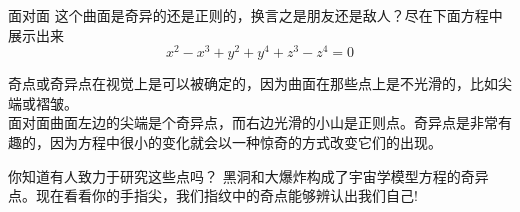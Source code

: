 ﻿\begin{surferPage}{面对面}
这个曲面是奇异的还是正则的，换言之是朋友还是敌人？尽在下面方程中展示出来\\
\smallskip
\[x^2	- x^3+ y^2+ y^4+ z^3- z^4	=  0\]

\vspace{0.3cm}

奇点或奇异点在视觉上是可以被确定的，因为曲面在那些点上是不光滑的，比如尖端或褶皱。\\

\vspace{0.3cm}
面对面曲面左边的尖端是个奇异点，而右边光滑的小山是正则点。奇异点是非常有趣的，因为方程中很小的变化就会以一种惊奇的方式改变它们的出现。 \\

\vspace{0.3cm}

你知道有人致力于研究这些点吗？ 黑洞和大爆炸构成了宇宙学模型方程的奇异点。现在看看你的手指尖，我们指纹中的奇点能够辨认出我们自己!
\end{surferPage}

